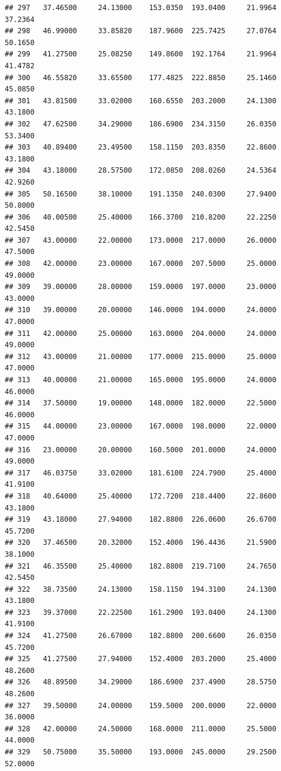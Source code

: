 \documentclass[]{article}
\begin{document}
\begin{verbatim}
## 297   37.46500     24.13000    153.0350  193.0400     21.9964       37.2364
## 298   46.99000     33.85820    187.9600  225.7425     27.0764       50.1650
## 299   41.27500     25.08250    149.8600  192.1764     21.9964       41.4782
## 300   46.55820     33.65500    177.4825  222.8850     25.1460       45.0850
## 301   43.81500     33.02000    160.6550  203.2000     24.1300       43.1800
## 302   47.62500     34.29000    186.6900  234.3150     26.0350       53.3400
## 303   40.89400     23.49500    158.1150  203.8350     22.8600       43.1800
## 304   43.18000     28.57500    172.0850  208.0260     24.5364       42.9260
## 305   50.16500     38.10000    191.1350  240.0300     27.9400       50.8000
## 306   40.00500     25.40000    166.3700  210.8200     22.2250       42.5450
## 307   43.00000     22.00000    173.0000  217.0000     26.0000       47.5000
## 308   42.00000     23.00000    167.0000  207.5000     25.0000       49.0000
## 309   39.00000     28.00000    159.0000  197.0000     23.0000       43.0000
## 310   39.00000     20.00000    146.0000  194.0000     24.0000       47.0000
## 311   42.00000     25.00000    163.0000  204.0000     24.0000       49.0000
## 312   43.00000     21.00000    177.0000  215.0000     25.0000       47.0000
## 313   40.00000     21.00000    165.0000  195.0000     24.0000       46.0000
## 314   37.50000     19.00000    148.0000  182.0000     22.5000       46.0000
## 315   44.00000     23.00000    167.0000  198.0000     22.0000       47.0000
## 316   23.00000     20.00000    160.5000  201.0000     24.0000       49.0000
## 317   46.03750     33.02000    181.6100  224.7900     25.4000       41.9100
## 318   40.64000     25.40000    172.7200  218.4400     22.8600       43.1800
## 319   43.18000     27.94000    182.8800  226.0600     26.6700       45.7200
## 320   37.46500     20.32000    152.4000  196.4436     21.5900       38.1000
## 321   46.35500     25.40000    182.8800  219.7100     24.7650       42.5450
## 322   38.73500     24.13000    158.1150  194.3100     24.1300       43.1800
## 323   39.37000     22.22500    161.2900  193.0400     24.1300       41.9100
## 324   41.27500     26.67000    182.8800  200.6600     26.0350       45.7200
## 325   41.27500     27.94000    152.4000  203.2000     25.4000       48.2600
## 326   48.89500     34.29000    186.6900  237.4900     28.5750       48.2600
## 327   39.50000     24.00000    159.5000  200.0000     22.0000       36.0000
## 328   42.00000     24.50000    168.0000  211.0000     25.5000       44.0000
## 329   50.75000     35.50000    193.0000  245.0000     29.2500       52.0000

\end{verbatim}
\end{document}
